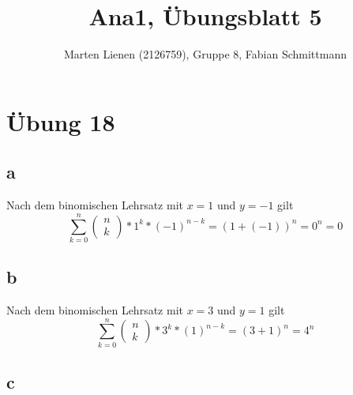\documentclass[a4paper,10pt]{article}
\title{Ana1, Übungsblatt 5}
\author{Marten Lienen (2126759), Gruppe 8, Fabian Schmittmann}
\begin{document}
\maketitle

\section*{Übung 18}

\subsection*{a}

Nach dem binomischen Lehrsatz mit $x = 1$ und $y = -1$ gilt
\begin{equation}
 \sum_{k = 0}^n \begin{pmatrix}n\\k\end{pmatrix} * 1^k * (-1)^{n - k} = (1 + (-1))^n = 0^n = 0
\end{equation}

\subsection*{b}

Nach dem binomischen Lehrsatz mit $x = 3$ und $y = 1$ gilt
\begin{equation}
 \sum_{k = 0}^n \begin{pmatrix}n\\k\end{pmatrix} * 3^k * (1)^{n - k} = (3 + 1)^n = 4^n
\end{equation}

\subsection*{c}
\end{document}

